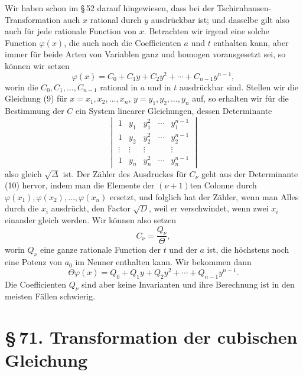 \documentclass[11pt]{article}
\providecommand{\sect}[2]{\section*{\S\,#1. #2}}
\begin{document}
Wir haben schon im \S\,52 darauf hingewiesen, dass bei der Tschirnhausen-Transformation auch $x$ rational durch $y$ ausdrückbar ist; und dasselbe gilt also auch für jede rationale Function von $x$. Betrachten wir irgend eine solche Function $\varphi(x)$, die auch noch die Coefficienten $a$ und $t$ enthalten kann, aber immer für beide Arten von Variablen ganz und homogen vorausgesetzt sei, so können wir setzen
\begin{equation}
 \varphi(x)=C_0+C_1y+C_2y^2+\cdots+C_{n-1}y^{n-1},
\tag{9}
\end{equation}
worin die $C_0,C_1,\ldots,C_{n-1}$ rational in $a$ und in $t$ ausdrückbar sind. Stellen wir die Gleichung (9) für $x=x_1,x_2,\ldots,x_n$, $y=y_1,y_2,\ldots,y_n$ auf, so erhalten wir für die Bestimmung der $C$ ein System linearer Gleichungen, dessen Determinante
\begin{equation}
\begin{vmatrix}
1&y_1&y_1^2&\cdots&y_1^{n-1}\\
1&y_2&y_2^2&\cdots&y_2^{n-1}\\
\vdots&\vdots&\vdots&&\vdots\\
1&y_n&y_n^2&\cdots&y_n^{n-1}
\end{vmatrix}
\tag{10}
\end{equation}
also gleich $\sqrt{\Delta}$ ist. Der Zähler des Ausdruckes für $C_\nu$ geht aus der Determinante (10) hervor, indem man die Elemente der $(\nu+1)$ten Colonne durch $\varphi(x_1),\varphi(x_2),\ldots,\varphi(x_n)$ ersetzt, und folglich hat der Zähler, wenn man Alles durch die $x_i$ ausdrückt, den Factor $\sqrt{D}$, weil er verschwindet, wenn zwei $x_i$ einander gleich werden. Wir können also setzen
\[
 C_\nu=\frac{Q_\nu}{\Theta},
\]
worin $Q_\nu$ eine ganze rationale Function der $t$ und der $a$ ist, die höchstens noch eine Potenz von $a_0$ im Nenner enthalten kann. Wir bekommen dann
\begin{equation}
 \Theta\varphi(x)=Q_0+Q_1y+Q_2y^2+\cdots+Q_{n-1}y^{n-1}.
\tag{11}
\end{equation}
Die Coefficienten $Q_\nu$ sind aber keine Invarianten und ihre Berechnung ist in den meisten Fällen schwierig.

\sect{71}{Transformation der cubischen Gleichung}
\end{document}
